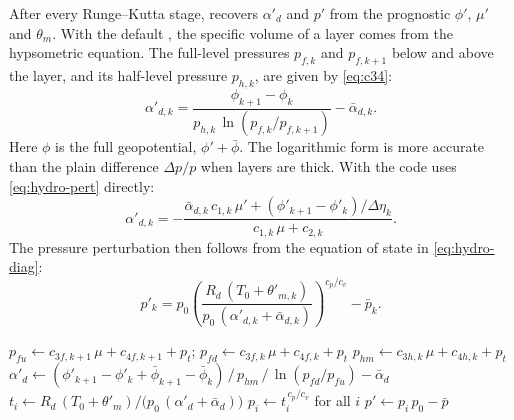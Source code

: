 After every Runge--Kutta stage,  recovers $\alpha'_d$ and
$p'$ from the prognostic $\phi'$, $\mu'$ and $\theta_m$. With the default , the specific
volume of a layer comes from the hypsometric equation. The full-level pressures $p_{f,k}$ and $p_{f,k+1}$ below and
above the layer, and its half-level pressure $p_{h,k}$, are given by \cref{eq:c34}:
\begin{equation}
  \alpha'_{d,k} = \frac{\phi_{k+1} - \phi_k}{p_{h,k}\,\ln(p_{f,k}/p_{f,k+1})} - \bar\alpha_{d,k} .
  \label{eq:al-hyps}
\end{equation}
Here $\phi$ is the full geopotential, $\phi' + \bar\phi$. The logarithmic form is more accurate than the plain
difference $\Delta p/p$ when layers are thick. With  the code uses \cref{eq:hydro-pert}
directly:
\begin{equation}
  \alpha'_{d,k} = -\frac{\bar\alpha_{d,k}\,c_{1,k}\,\mu' + (\phi'_{k+1} - \phi'_k)/\Delta\eta_k}{c_{1,k}\,\mu + c_{2,k}} .
\end{equation}
The pressure perturbation then follows from the equation of state in \cref{eq:hydro-diag}:
\begin{equation}
  p'_k = p_0\left(\frac{R_d\,(T_0 + \theta'_{m,k})}{p_0\,(\alpha'_{d,k} + \bar\alpha_{d,k})}\right)^{c_p/c_v} - \bar p_k .
  \label{eq:eos-code}
\end{equation}

\begin{algorithm}[ht]
\caption{Diagnosing $\alpha'_d$ and $p'$ after a stage (, , moist
case). The loops are $j$, $k$, $i$ from the outside in, as in the source.}
\label{alg:calc-p-rho-phi}
\begin{algorithmic}[1]
  \State $p_{fu} \gets c_{3f,k+1}\,\mu + c_{4f,k+1} + p_t$; \quad $p_{fd} \gets c_{3f,k}\,\mu + c_{4f,k} + p_t$
  \State $p_{hm} \gets c_{3h,k}\,\mu + c_{4h,k} + p_t$
  \State $\alpha'_{d} \gets (\phi'_{k+1} - \phi'_k + \bar\phi_{k+1} - \bar\phi_k)\,/\,p_{hm}\,/\,\ln(p_{fd}/p_{fu}) - \bar\alpha_d$
\EndFor
{}
    \State $t_i \gets R_d\,(T_0 + \theta'_m) / \bigl(p_0\,(\alpha'_d + \bar\alpha_d)\bigr)$
  \EndFor
  \State $p_i \gets t_i^{\,c_p/c_v}$ for all $i$ 
    \State $p' \gets p_i\,p_0 - \bar p$
  \EndFor
\EndFor
\end{algorithmic}
\end{algorithm}


